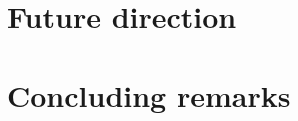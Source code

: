 \documentclass[../Matt_Gebert_Honours_Thesis.tex]{subfiles}
\begin{document}

\section{Future direction}

\section{Concluding remarks}
\end{document}
